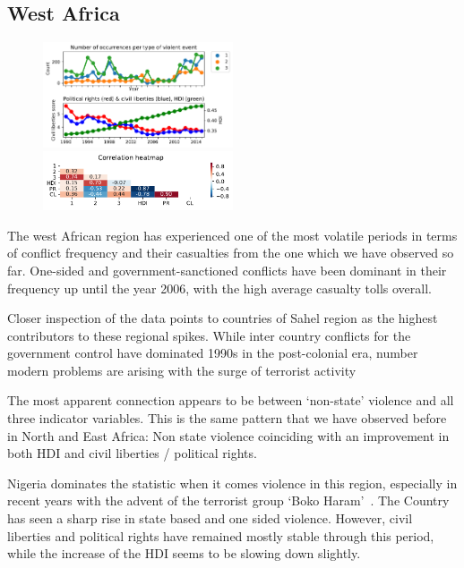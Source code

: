 \documentclass[a4paper,11pt]{article}
\begin{document}
\subsection{West Africa}
\begin{figure}[ht!]
    \includegraphics[width=0.50\textwidth]{images/wa.pdf}
    \includegraphics[width=0.50\textwidth]{images/wa_corr.pdf}
\end{figure}
The west African region has experienced one of the most volatile periods in terms of conflict frequency and their casualties from the one which we have observed so far. One-sided and government-sanctioned conflicts have been dominant in their frequency up until the year 2006, with the high average casualty tolls overall. 

Closer inspection of the data points to countries of Sahel region as the highest contributors to these regional spikes. While inter country conflicts for the government control have dominated 1990s in the post-colonial era, number modern problems are arising with the surge of terrorist activity 

The most apparent connection appears to be between `non-state' violence and all three indicator variables. This is the same pattern that we have observed before in North and East Africa: Non state violence coinciding with an improvement in both HDI and civil liberties / political rights.

Nigeria dominates the statistic when it comes violence in this region, especially in recent years with the advent of the terrorist group `Boko Haram'~\cite{wiki:boko}. The Country has seen a sharp rise in state based and one sided violence. However, civil liberties and political rights have remained mostly stable through this period, while the increase of the HDI seems to be slowing down slightly.
\end{document}
